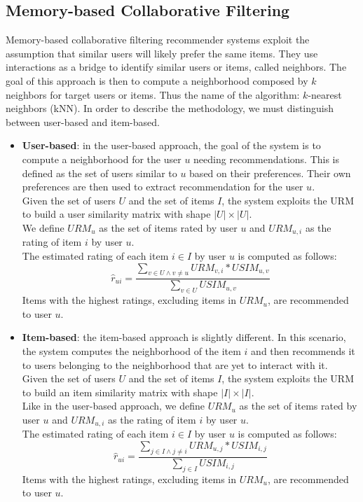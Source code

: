 \subsection{Memory-based Collaborative Filtering}

Memory-based collaborative filtering recommender systems \cite{10.1007/978-0-387-85820-3_1} exploit the assumption that similar users will likely prefer the same items. They use interactions as a bridge to identify similar users or items, called neighbors. The goal of this approach is then to compute a neighborhood composed by $k$ neighbors for target users or items. Thus the name of the algorithm: $k$-nearest neighbors (kNN). In order to describe the methodology, we must distinguish between user-based and item-based.
\begin{itemize}
\item \textbf{User-based}: in the user-based approach, the goal of the system is to compute a neighborhood for the user $u$ needing recommendations. This is defined as the set of users similar to $u$ based on their preferences. Their own preferences are then used to extract recommendation for the user $u$.\\
Given the set of users $U$ and the set of items $I$, the system exploits the URM to build a user similarity matrix with shape $|U| \times |U|$.\\
We define $URM_u$ as the set of items rated by user $u$ and $URM_{u,i}$ as the rating of item $i$ by user $u$.\\
The estimated rating of each item $i \in I$ by user $u$ is computed as follows:
\begin{equation*}
\hat{r}_{ui} = \frac{\sum_{v \in U \wedge v \neq u} URM_{v,i} * USIM_{u,v}}{\sum_{v \in U} USIM_{u,v}}
\end{equation*}
Items with the highest ratings, excluding items in $URM_u$, are recommended to user $u$.
\item \textbf{Item-based}: the item-based approach is slightly different. In this scenario, the system computes the neighborhood of the item $i$ and then recommends it to users belonging to the neighborhood that are yet to interact with it.\\
Given the set of users $U$ and the set of items $I$, the system exploits the URM to build an item similarity matrix with shape $|I| \times |I|$.\\
Like in the user-based approach, we define $URM_u$ as the set of items rated by user $u$ and $URM_{u,i}$ as the rating of item $i$ by user $u$.\\
The estimated rating of each item $i \in I$ by user $u$ is computed as follows:
\begin{equation*}
\hat{r}_{ui} = \frac{\sum_{j \in I \wedge j \neq i} URM_{u,j} * USIM_{i,j}}{\sum_{j \in I} USIM_{i,j}}
\end{equation*}
Items with the highest ratings, excluding items in $URM_u$, are recommended to user $u$.
\end{itemize}


